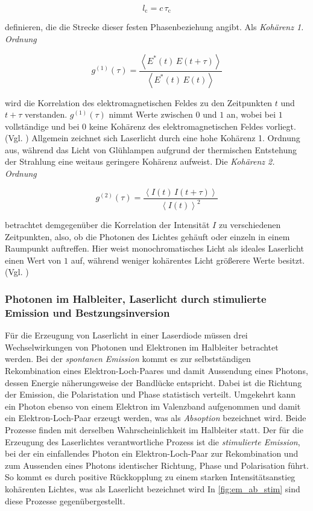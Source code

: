 \begin{equation*}
l_{\mathrm{c}} = c\,\tau_{\mathrm{c}}
\end{equation*}

definieren, die die Strecke dieser festen Phasenbeziehung angibt.
Als \textit{Kohärenz 1. Ordnung}

\begin{equation*}
g^{(1)}(\tau)
=
\frac{\left\langle E^*(t)\,E(t+\tau)\right\rangle}
{\left\langle E^*(t)\,E(t)\right\rangle}
\end{equation*}

wird die Korrelation des elektromagnetischen Feldes zu den Zeitpunkten $t$ und $t+\tau$ verstanden. $g^{(1)}(\tau)$ nimmt Werte zwischen $0$ und $1$ an, wobei
bei $1$ vollständige und bei $0$ keine Kohärenz des elektromagnetischen Feldes vorliegt.(Vgl. \cite{steck_coherence})
Allgemein zeichnet sich Laserlicht durch eine hohe Kohärenz 1. Ordnung aus, während das Licht von Glühlampen aufgrund der thermischen Entstehung der Strahlung
eine weitaus geringere Kohärenz aufweist.
Die \textit{Kohärenz 2. Ordnung} 

\begin{equation*}
g^{(2)}(\tau)
=
\frac{\left\langle I(t)\,I(t+\tau)\right\rangle}
{\left\langle I(t)\right\rangle^2}
\end{equation*}


betrachtet demgegenüber die Korrelation der Intensität $I$ zu verschiedenen Zeitpunkten, also, ob die Photonen des Lichtes gehäuft oder einzeln in einem Raumpunkt auftreffen.
Hier weist monochromatisches Licht als ideales Laserlicht einen Wert von $1$ auf, während weniger kohärentes Licht größerere Werte besitzt.(Vgl. \cite{steck_coherence})






\subsubsection{Photonen im Halbleiter, Laserlicht durch stimulierte Emission und Bestzungsinversion}

Für die Erzeugung von Laserlicht in einer Laserdiode müssen drei Wechselwirkungen von Photonen und Elektronen im Halbleiter betrachtet werden.
Bei der \textit{spontanen Emission} kommt es zur selbstständigen Rekombination eines Elektron-Loch-Paares  und damit Aussendung eines Photons, dessen
Energie näherungsweise der Bandlücke entspricht. Dabei ist die Richtung der Emission, die Polaristation und Phase statistisch verteilt.
Umgekehrt kann ein Photon ebenso von einem Elektron im Valenzband aufgenommen und damit ein Elektron-Loch-Paar erzeugt werden, was als \textit{Absoption} bezeichnet wird.
Beide Prozesse finden mit derselben Wahrscheinlichkeit im Halbleiter statt.
Der für die Erzeugung des Laserlichtes verantwortliche Prozess ist die \textit{stimulierte Emission}, bei der ein einfallendes Photon ein Elektron-Loch-Paar
zur Rekombination und zum Aussenden eines Photons identischer Richtung, Phase und Polarisation führt. So kommt es durch positive Rückkopplung zu einem
starken Intensitätsanstieg kohärenten Lichtes, was als Laserlicht bezeichnet wird
In \autoref{fig:em_ab_stim} sind diese Prozesse gegenübergestellt.

